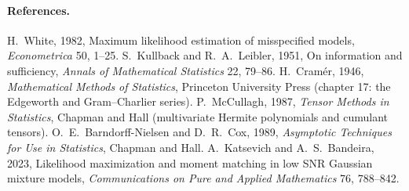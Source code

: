 \paragraph{References.}
\begingroup\sloppy
H.~White, 1982, Maximum likelihood estimation of misspecified models, \emph{Econometrica} 50, 1--25.
S.~Kullback and R.~A.~Leibler, 1951, On information and sufficiency, \emph{Annals of Mathematical Statistics} 22, 79--86.
H.~Cram\'er, 1946, \emph{Mathematical Methods of Statistics}, Princeton University Press (chapter 17: the Edgeworth and Gram--Charlier series).
P.~McCullagh, 1987, \emph{Tensor Methods in Statistics}, Chapman and Hall (multivariate Hermite polynomials and cumulant tensors).
O.~E.~Barndorff-Nielsen and D.~R.~Cox, 1989, \emph{Asymptotic Techniques for Use in Statistics}, Chapman and Hall.
A.~Katsevich and A.~S.~Bandeira, 2023, Likelihood maximization and moment matching in low SNR Gaussian mixture models, \emph{Communications on Pure and Applied Mathematics} 76, 788--842.\par\endgroup
